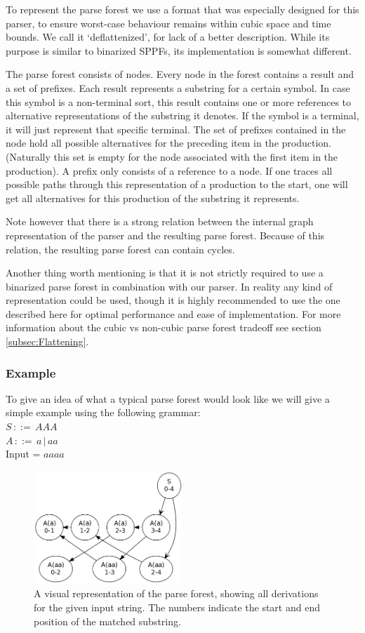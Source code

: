 \documentclass[a4paper,10pt]{article}
\begin{document}
To represent the parse forest we use a format that was especially designed for this parser, to ensure worst-case behaviour remains within cubic space and time bounds. We call it `deflattenized', for lack of a better description. While its purpose is similar to binarized SPPFs, its implementation is somewhat different.

The parse forest consists of nodes. Every node in the forest contains a result and a set of prefixes. Each result represents a substring for a certain symbol. In case this symbol is a non-terminal sort, this result contains one or more references to alternative representations of the substring it denotes. If the symbol is a terminal, it will just represent that specific terminal. The set of prefixes contained in the node hold all possible alternatives for the preceding item in the production. (Naturally this set is empty for the node associated with the first item in the production). A prefix only consists of a reference to a node. If one traces all possible paths through this representation of a production to the start, one will get all alternatives for this production of the substring it represents.

Note however that there is a strong relation between the internal graph representation of the parser and the resulting parse forest. Because of this relation, the resulting parse forest can contain cycles.

Another thing worth mentioning is that it is not strictly required to use a binarized parse forest in combination with our parser. In reality any kind of representation could be used, though it is highly recommended to use the one described here for optimal performance and ease of implementation. For more information about the cubic vs non-cubic parse forest tradeoff see section \ref{subsec:Flattening}.

\subsubsection{Example}
To give an idea of what a typical parse forest would look like we will give a simple example using the following grammar:\\
$S\,::=\,AAA$\\
$A\,::=\,a\,|\,aa$\\
Input = $aaaa$

\begin{figure}[H]
\centering
\includegraphics[width=0.5\textwidth]{a_aa-forest.png}
\caption{A visual representation of the parse forest, showing all derivations for the given input string. The numbers indicate the start and end position of the matched substring.}
\end{figure}
\end{document}
